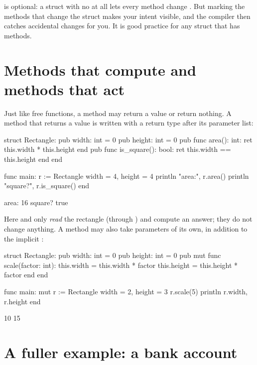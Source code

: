 \begin{note}
 is optional: a struct with no  at all lets every
method change . But marking the methods that change the struct makes
your intent visible, and the compiler then catches accidental changes for you.
It is good practice for any struct that has methods.
\end{note}

\section{Methods that compute and methods that act}

Just like free functions, a method may return a value or return nothing. A method
that returns a value is written with a return type after its parameter list:

\begin{salamen}
struct Rectangle:
    pub width: int = 0
    pub height: int = 0
    pub func area(): int:
        ret this.width * this.height
    end
    pub func is_square(): bool:
        ret this.width == this.height
    end
end

func main:
    r := Rectangle { width = 4, height = 4 }
    println "area:", r.area()
    println "square?", r.is_square()
end
\end{salamen}

\begin{progout}
area: 16
square? true
\end{progout}

Here  and  only \emph{read} the rectangle (through
) and compute an answer; they do not change anything. A method may also
take parameters of its own, in addition to the implicit :

\begin{salamen}
struct Rectangle:
    pub width: int = 0
    pub height: int = 0
    pub mut func scale(factor: int):
        this.width = this.width * factor
        this.height = this.height * factor
    end
end

func main:
    mut r := Rectangle { width = 2, height = 3 }
    r.scale(5)
    println r.width, r.height
end
\end{salamen}

\begin{progout}
10 15
\end{progout}

\section{A fuller example: a bank account}

